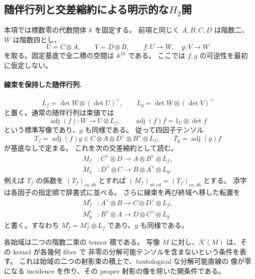 
\subsection{随伴行列と交差縮約による明示的な\texorpdfstring{$H_2$}{H2}開}
\label{subsec:qa-square-explicit-h2-open}

本項では標数零の代数閉体 $k$ を固定する。
前項と同じく $A,B,C,D$ は階数二、$W$ は階数四とし、
\[
 U=C\otimes A,\qquad V=D\otimes B,\qquad
 f:U\to W,\quad g:V\to W
\]
を取る。固定基底で全二積の空間は $\mathbb A^{32}$ である。
ここでは $f,g$ の可逆性を最初に仮定しない。

\paragraph{線束を保持した随伴行列.}
\[
 L_f=\det W\otimes(\det U)^\vee,\qquad
 L_g=\det W\otimes(\det V)^\vee
\]
と置く。通常の随伴行列は束値では
\[
 \operatorname{adj}(f):W\to U\otimes L_f,
 \qquad \operatorname{adj}(f)f=1_U\otimes\det f
\]
という標準写像であり、$g$ も同様である。
従って四因子テンソル
\[
 T_f=\operatorname{adj}(f)g\in
 C\otimes A\otimes D^\vee\otimes B^\vee\otimes L_f,
 \qquad T_g=\operatorname{adj}(g)f
\]
が基底なしで定まる。
これを次の交差縮約として読む。
\[
 \begin{split}
 M_f &:C^\vee\otimes D\longrightarrow A\otimes B^\vee\otimes L_f,\\
 M_g &:D^\vee\otimes C\longrightarrow B\otimes A^\vee\otimes L_g.
 \end{split}
 \tag{CF}\label{eq:qa-square-cross-flattenings}
\]
例えば $T_f$ の係数を $(T_f)_{ca,db}$ とすれば
$(M_f)_{ab,cd}=(T_f)_{ca,db}$ とする。
添字は各因子の指定順で辞書式に並べる。
さらに線束を再び終域へ移した転置を
\[
 \begin{split}
 M_f^{\mathrm t}&:A^\vee\otimes B\longrightarrow C\otimes D^\vee\otimes L_f,\\
 M_g^{\mathrm t}&:B^\vee\otimes A\longrightarrow D\otimes C^\vee\otimes L_g
 \end{split}
\]
と書く。すなわち $M_f^{\mathrm t}=M_f^\vee\otimes L_f$ であり、$g$ も同様である。

各始域は二つの階数二束の tensor 積である。
写像 $M$ に対し、$\mathcal K(M)$ は、その kernel が各幾何 fiber で
非零の分解可能テンソルを含まないという条件を表す。
これは始域の二つの射影束の積上で、tautological な分解可能直線の
像が零になる incidence を作り、その proper 射影の像を除いた開条件である。

